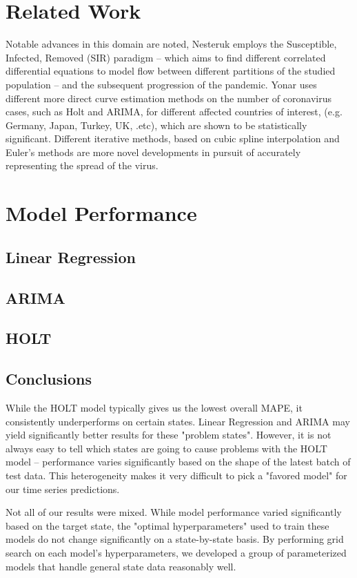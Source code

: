 \documentclass[sigconf,nonacm]{acmart}
\begin{document}
\section{Related Work}
Notable advances in this domain are noted, Nesteruk \cite{Nesteruk} employs the Susceptible, Infected, Removed (SIR) paradigm
– which aims to find different correlated differential equations to model flow between different partitions of the 
studied population – and the subsequent progression of the pandemic. Yonar \cite{EJMO} uses different more direct curve estimation methods
on the number of coronavirus cases, such as Holt and ARIMA, for different affected countries of interest, (e.g. Germany, Japan, Turkey, UK, .etc),
which are shown to be statistically significant. Different iterative methods, based on cubic spline interpolation and Euler's methods
are more novel developments in pursuit of accurately representing the spread of the virus.

\section{Model Performance}
\subsection{Linear Regression}
\subsection{ARIMA}
\subsection{HOLT}
\subsection{Conclusions}

While the HOLT model typically gives us the lowest overall MAPE, it
consistently underperforms on certain states. Linear Regression and ARIMA may
yield significantly better results for these "problem states". However, it is
not always easy to tell which states are going to cause problems with the HOLT
model -- performance varies significantly based on the shape of the latest
batch of test data. This heterogeneity makes it very difficult to pick a
"favored model" for our time series predictions. 

Not all of our results were mixed. While model performance varied significantly
based on the target state, the "optimal hyperparameters" used to train these
models do not change significantly on a state-by-state basis. By performing
grid search on each model's hyperparameters, we developed a group of
parameterized models that handle general state data reasonably well. 
\end{document}
